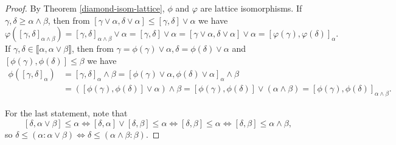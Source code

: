 \documentclass[letterpaper,11pt]{article}
\begin{document}
\begin{proof} By Theorem \ref{diamond-isom-lattice}, $\phi$ and $\varphi$ are lattice isomorphisms. %
If $\gamma,\delta \ge \alpha\wedge \beta$, then from $[\gamma \vee \alpha, \delta \vee \alpha] \le [\gamma,\delta] \vee \alpha$ we have
\[
\varphi([\gamma,\delta]_{\alpha\wedge \beta}) = [\gamma,\delta]_{\alpha\wedge \beta} \vee \alpha = [\gamma,\delta]\vee \alpha = [\gamma \vee \alpha, \delta \vee \alpha] \vee \alpha = [\varphi(\gamma),\varphi(\delta)]_\alpha.
\]
If $\gamma,\delta \in \llbracket\alpha, \alpha\vee\beta\rrbracket$, then from $\gamma = \phi(\gamma) \vee \alpha, \delta = \phi(\delta) \vee \alpha$ and $[\phi(\gamma),\phi(\delta)] \le \beta$ we have
\begin{align*}
\phi([\gamma,\delta]_\alpha) &= [\gamma,\delta]_\alpha \wedge \beta = [\phi(\gamma)\vee \alpha, \phi(\delta) \vee \alpha]_\alpha \wedge \beta\\
&= ([\phi(\gamma),\phi(\delta)]\vee \alpha) \wedge \beta = [\phi(\gamma),\phi(\delta)]\vee (\alpha \wedge \beta) = [\phi(\gamma),\phi(\delta)]_{\alpha\wedge \beta}.
\end{align*}

For the last statement, note that
\[
[\delta,\alpha\vee\beta] \le \alpha \iff [\delta,\alpha]\vee[\delta,\beta] \le \alpha \iff [\delta,\beta] \le \alpha \iff [\delta,\beta] \le \alpha \wedge \beta,
\]
so $\delta \le (\alpha : \alpha\vee \beta) \iff \delta \le (\alpha \wedge \beta : \beta)$.
\end{proof}

\end{document}
